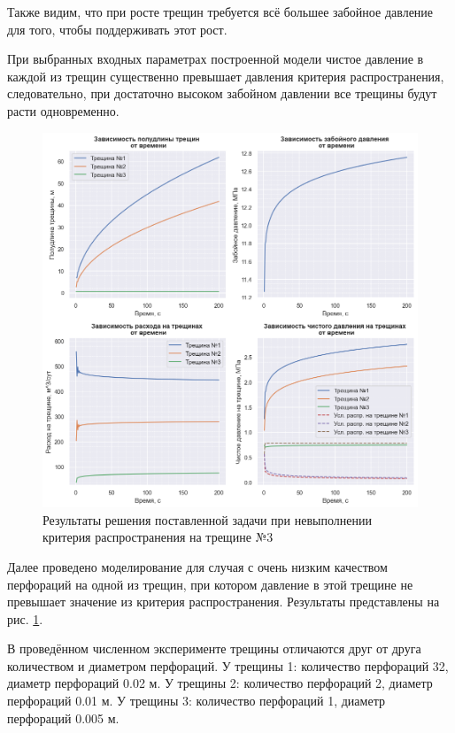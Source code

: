 Также видим, что при росте трещин требуется всё большее забойное давление для того, чтобы поддерживать этот рост.

При выбранных входных параметрах построенной модели чистое давление в каждой из трещин существенно превышает давления критерия распространения, следовательно, при достаточно высоком забойном давлении все трещины будут расти одновременно.\\

\begin{figure}[H] 
\center
\includegraphics[width=0.9\linewidth]{images/Kirchhoff+Koning_2.png}
\caption{Результаты решения поставленной задачи при невыполнении критерия распространения на трещине №3} 
\label{fig:results2}  
\end{figure}

Далее проведено моделирование для случая с очень низким качеством перфораций на одной из трещин, при котором давление в этой трещине не превышает значение из критерия распространения.
Результаты представлены на рис. \ref{fig:results2}.

В проведённом численном эксперименте трещины отличаются друг от друга количеством и диаметром перфораций.\newline
У трещины 1: количество перфораций 32, диаметр перфораций 0.02 м.\newline
У трещины 2: количество перфораций 2, диаметр перфораций 0.01 м.\newline
У трещины 3: количество перфораций 1, диаметр перфораций 0.005 м.
\\

